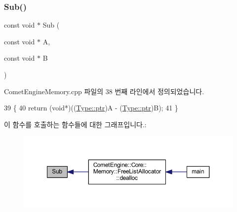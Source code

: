 \subsubsection{\texorpdfstring{Sub()}{Sub()}}
{\footnotesize\ttfamily const void $\ast$ Sub (\begin{DoxyParamCaption}\item[{const void $\ast$}]{A,  }\item[{const void $\ast$}]{B }\end{DoxyParamCaption})}



Comet\+Engine\+Memory.\+cpp 파일의 38 번째 라인에서 정의되었습니다.


\begin{DoxyCode}
39 \{
40     \textcolor{keywordflow}{return} (\textcolor{keywordtype}{void}*)((\hyperlink{namespace_comet_engine_1_1_type_aeb22ad46de677e9a50679dfebeb0e6f0}{Type::ptr})A - (\hyperlink{namespace_comet_engine_1_1_type_aeb22ad46de677e9a50679dfebeb0e6f0}{Type::ptr})B);
41 \}
\end{DoxyCode}
이 함수를 호출하는 함수들에 대한 그래프입니다.\+:\nopagebreak
\begin{figure}[H]
\begin{center}
\leavevmode
\includegraphics[width=350pt]{namespace_comet_engine_1_1_core_1_1_memory_1_1_utils_a4e360b8988f0de099daa987e3b5f09ed_icgraph}
\end{center}
\end{figure}
